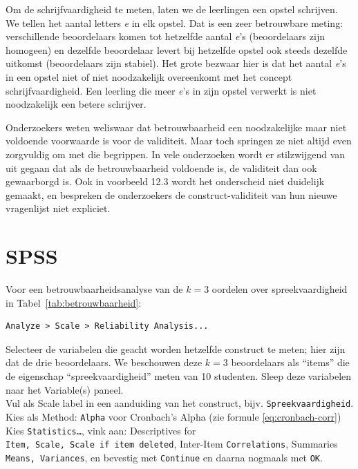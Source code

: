 \documentclass[
]{book}
\begin{document}
Om de schrijfvaardigheid te meten, laten we de leerlingen een opstel
schrijven. We tellen het aantal letters \emph{e} in elk opstel. Dat is een
zeer betrouwbare meting: verschillende beoordelaars komen tot hetzelfde
aantal \emph{e}'s (beoordelaars zijn homogeen) en dezelfde beoordelaar levert
bij hetzelfde opstel ook steeds dezelfde uitkomst (beoordelaars zijn
stabiel). Het grote bezwaar hier is dat het aantal \emph{e}'s in een opstel
niet of niet noodzakelijk overeenkomt met het concept
schrijfvaardigheid. Een leerling die meer \emph{e}'s in zijn opstel verwerkt
is niet noodzakelijk een betere schrijver.

Onderzoekers weten weliswaar dat betrouwbaarheid een noodzakelijke maar
niet voldoende voorwaarde is voor de validiteit. Maar toch springen ze
niet altijd even zorgvuldig om met die begrippen. In vele onderzoeken
wordt er stilzwijgend van uit gegaan dat als de betrouwbaarheid
voldoende is, de validiteit dan ook gewaarborgd is. Ook in voorbeeld 12.3
wordt het onderscheid niet duidelijk gemaakt,
en bespreken de onderzoekers de construct-validiteit van hun nieuwe
vragenlijst niet expliciet.

\hypertarget{spss-9}{%
\section{SPSS}\label{spss-9}}

Voor een betrouwbaarheidsanalyse van de \(k=3\) oordelen over
spreekvaardigheid in
Tabel~\ref{tab:betrouwbaarheid}:\\

\begin{verbatim}
Analyze > Scale > Reliability Analysis...
\end{verbatim}

Selecteer de variabelen die geacht worden hetzelfde construct te meten;
hier zijn dat de drie beoordelaars. We beschouwen deze \(k=3\)
beoordelaars als ``items'' die de eigenschap ``spreekvaardigheid'' meten van
10 studenten. Sleep deze variabelen naar het Variable(s) paneel.\\
Vul als Scale label in een aanduiding van het construct, bijv.
\texttt{Spreekvaardigheid}.\\
Kies als Method: \texttt{Alpha} voor Cronbach's Alpha (zie formule
\eqref{eq:cronbach-corr})\\
Kies \texttt{Statistics\ldots{}}, vink aan: Descriptives for
\texttt{Item,\ Scale,\ Scale\ if\ item\ deleted}, Inter-Item \texttt{Correlations},
Summaries \texttt{Means,\ Variances}, en bevestig met \texttt{Continue} en daarna
nogmaals met \texttt{OK}.
\end{document}
